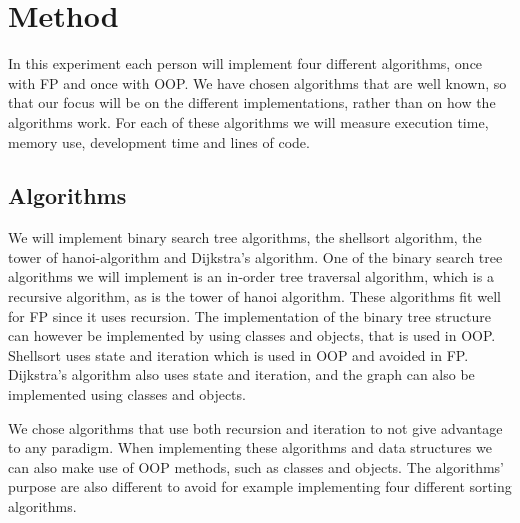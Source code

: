 \documentclass {article}
\begin{document}
\section{Method}
In this experiment each person will implement four different algorithms, once with FP and once with OOP. We have chosen algorithms that are well known, so that our focus will be on the different implementations, rather than on how the algorithms work. For each of these algorithms we will measure execution time, memory use, development time and lines of code.
\subsection{Algorithms}
We will implement binary search tree algorithms, the shellsort algorithm, the tower of hanoi-algorithm and Dijkstra's algorithm. One of the binary search tree algorithms we will implement is an in-order tree traversal algorithm, which is a recursive algorithm, as is the tower of hanoi algorithm. These algorithms fit well for FP since it uses recursion. The implementation of the binary tree structure can however be implemented by using classes and objects, that is used in OOP. Shellsort uses state and iteration which is used in OOP and avoided in FP. Dijkstra's algorithm also uses state and iteration, and the graph can also be implemented using classes and objects.

We chose algorithms that use both recursion and iteration to not give advantage to any paradigm. When implementing these algorithms and data structures we can also make use of OOP methods, such as classes and objects. The algorithms' purpose are also different to avoid for example implementing four different sorting algorithms. 
\end{document}
